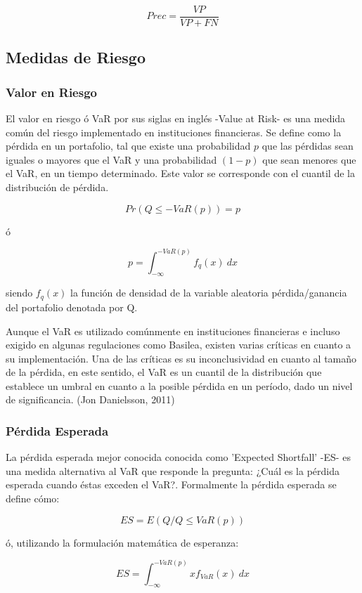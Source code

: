 \documentclass[a4paper,12pt]{Latex/Classes/PhDthesisPSnPDF}
\begin{document}
$$ Prec = \frac{VP}{VP + FN} $$

\subsection{Medidas de Riesgo}

\subsubsection{Valor en Riesgo}

El valor en riesgo ó VaR por sus siglas en inglés -Value at Risk- es una medida común del riesgo implementado en instituciones financieras. Se define como la pérdida en un portafolio, tal que existe una probabilidad $p$ que las pérdidas sean iguales o mayores que el VaR y una probabilidad $(1-p)$ que sean menores que el VaR, en un tiempo determinado. Este valor se corresponde con el cuantil de la distribución de pérdida. 

$$ Pr(Q \leq -VaR(p)) = p $$

ó

$$ p = \int_{-\infty}^{-VaR(p)}f_{q}(x)\ dx $$

siendo $f_{q}(x)$ la función de densidad de la variable aleatoria pérdida/ganancia del portafolio denotada por Q.

Aunque el VaR es utilizado comúnmente en instituciones financieras e incluso exigido en algunas regulaciones como Basilea, existen varias críticas en cuanto a su implementación. Una de las críticas es su inconclusividad en cuanto al tamaño de la pérdida, en este sentido, el VaR es un cuantil de la distribución que establece un umbral en cuanto a la posible pérdida en un período, dado un nivel de significancia. (Jon Danielsson, 2011)

\subsubsection{Pérdida Esperada}

La pérdida esperada mejor conocida conocida como 'Expected Shortfall' -ES- es una medida alternativa al VaR que responde la pregunta: ¿Cuál es la pérdida esperada cuando éstas exceden el VaR?. Formalmente la pérdida esperada se define cómo:

$$ ES = E(Q/Q \leq VaR(p)) $$ 

ó, utilizando la formulación matemática de esperanza:

$$ ES = \int_{-\infty}^{-VaR(p)} xf_{VaR}(x)\ dx $$
\end{document}
